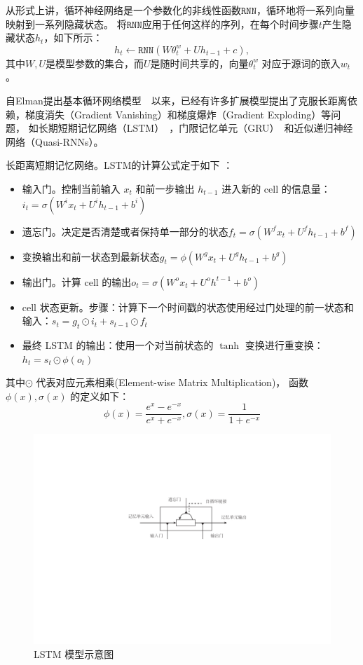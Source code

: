 从形式上讲，循环神经网络是一个参数化的非线性函数$ \mathtt{RNN} $，循环地将一系列向量映射到一系列隐藏状态。 将$ \mathtt{RNN} $应用于任何这样的序列，在每个时间步骤$ t $产生隐藏状态$ h_t $，如下所示：
\begin{equation}
  h_t \leftarrow  \mathtt{RNN}(W\theta^w_t + U h_{t-1} +c),
\end{equation}
其中$ W,U $是模型参数的集合，而$ U $是随时间共享的，向量$ \theta^w_t$ 对应于源词的嵌入$ w_t $。

自Elman提出基本循环网络模型~~以来，已经有许多扩展模型提出了克服长距离依赖，梯度消失（Gradient Vanishing）和梯度爆炸（Gradient Exploding）等问题， 如长期短期记忆网络（LSTM）~，门限记忆单元（GRU）~和近似递归神经网络（Quasi-RNNs）。



{长距离短期记忆网络}。LSTM的计算公式定于如下 ：
\begin{itemize}
\item 输入门。控制当前输入 $x_t$ 和前一步输出 $h_{t−1}$ 进入新的 cell 的信息量：$i_t=\sigma(W^i x_t+U^i h_{t-1}+b^i)$
\item  遗忘门。决定是否清楚或者保持单一部分的状态$f_t=\sigma(W^f x_t+U^f h_{t-1}+b^f)$
\item  变换输出和前一状态到最新状态$g_t=\phi(W^g x_t+U^g h_{t-1}+b^g)$
\item  输出门。计算 cell 的输出$o_t=\sigma(W^o x_t+U^o h^{t-1}+b^o)$
\item  cell 状态更新。步骤：计算下一个时间戳的状态使用经过门处理的前一状态和输入：$s_t=g_t\odot i_t+s_{t-1}\odot f_t$
\item 最终 LSTM 的输出：使用一个对当前状态的 $\tanh$ 变换进行重变换：$h_t=s_t\odot \phi(o_t)$
\end{itemize}
\noindent 其中$\odot$ 代表对应元素相乘(Element-wise Matrix Multiplication)， 函数 $\phi(x), \sigma(x)$ 的定义如下：
\begin{equation}\label{equ:tanh}
  \phi(x)=\frac{e^x-e^{-x}}{e^x+e^{-x}},\sigma(x)=\frac{1}{1+e^{-x}}
\end{equation}

\begin{figure}[!ht]
  \centering
  \includegraphics[width=0.7\linewidth]{./figures/lstm.pdf}
  \caption{LSTM 模型示意图}\label{fig:lstm}
\end{figure}

